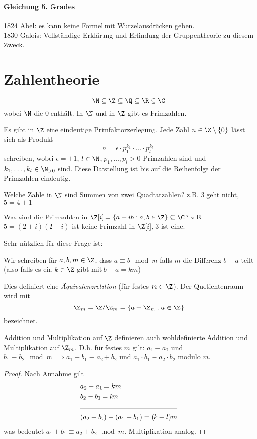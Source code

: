 \paragraph{Gleichung 5. Grades}
1824 Abel: es kann keine Formel mit Wurzelausdrücken geben.\\
1830 Galois: Vollständige Erklärung und Erfindung der Gruppentheorie zu diesem Zweck.

\section{Zahlentheorie}
\[
\N \subseteq \Z \subseteq \Q \subseteq \R \subseteq \C
\] 
wobei $\N$ die $0$ enthält. In $\N$ und in $\Z$ gibt es Primzahlen.
\begin{theorem}
	Es gibt in $\Z$ eine eindeutige Primfaktorzerlegung.
	Jede Zahl $n \in \Z \setminus \{0\}$ lässt sich als Produkt
	\[
	n = \epsilon \cdot p_1^{k_1} \cdot \ldots \cdot p_{l}^{k_{l}}
	.\] 
	schreiben, wobei $\epsilon = \pm 1$, $l \in \N$, $p_1,\ldots,p_{l} > 0$ Primzahlen sind und $k_1,\ldots,k_{l} \in \N_{> 0}$ sind.
	Diese Darstellung ist bis auf die Reihenfolge der Primzahlen eindeutig.
\end{theorem}

Welche Zahle in $\N$ sind Summen von zwei Quadratzahlen?
z.B. $3$ geht nicht, $5 = 4+1$

Was sind die Primzahlen in $\Z[i] = \{a + ib: a,b \in \Z\} \subseteq \C$?
z.B. $5 = (2+i)(2-i)$ ist keine Primzahl in $\Z[i]$, $3$ ist eine.

Sehr nützlich für diese Frage ist:
\begin{definition}
	Wir schreiben für $a,b,m \in \Z$, dass $a \equiv b \mod m$ falls $m$ die Differenz $b-a$ teilt (also falls es ein  $k \in \Z$ gibt mit $b-a = k m $)
\end{definition}

Dies definiert eine \emph{Äquivalenzrelation} (für festes $m \in \Z$).
Der Quotientenraum wird mit 
\[
	\Z_{m} = \Z / \Z_{m} = \{a + \Z_{m}: a \in \Z\} 
\]
bezeichnet.

\begin{lemma}
	Addition und Multiplikation auf $\Z$ definieren auch wohldefinierte Addition und Multiplikation auf $\Z_{m}$.
	D.h. für festes $m$ gilt: $a_1 \equiv a_2$ und $b_1 \equiv b_2 \mod m \implies a_1 + b_1 \equiv a_2 + b_2$ und $a_1 \cdot b_1 \equiv a_2 \cdot b_2$ modulo $m$.
\end{lemma}

\begin{proof}
	Nach Annahme gilt
	\begin{align*}
		&a_2 - a_1 = km\\
		&b_2 - b_1 = lm\\
		\cline{1-2}
		&(a_2+b_2) - (a_1+b_1) = (k+l)m
	\end{align*}
	was bedeutet $a_1 + b_1 \equiv a_2 + b_2 \mod m$.
	Multiplikation analog.
\end{proof}

